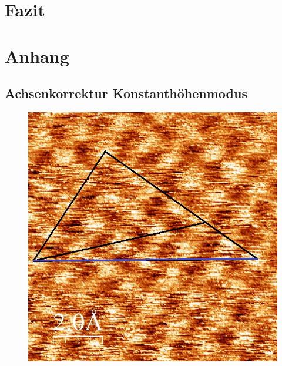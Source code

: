 \documentclass[12pt,a4paper]{article}
\begin{document}
\section{Fazit}

\section{Anhang}

\subsection{Achsenkorrektur Konstanthöhenmodus}
\begin{figure}[H]
\centering
\includegraphics[scale=0.36]{Bilder/Atome/hoch1_h.jpg}

\end{figure}
\end{document}

